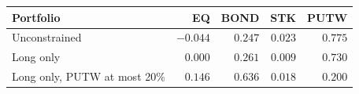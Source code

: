 \begin{tabular}{lrrrr}
\toprule
Portfolio & EQ & BOND & STK & PUTW \\
\midrule
Unconstrained & $-0.044$ & $0.247$ & $0.023$ & $0.775$ \\
Long only & $0.000$ & $0.261$ & $0.009$ & $0.730$ \\
Long only, PUTW at most 20\% & $0.146$ & $0.636$ & $0.018$ & $0.200$ \\
\bottomrule
\end{tabular}
